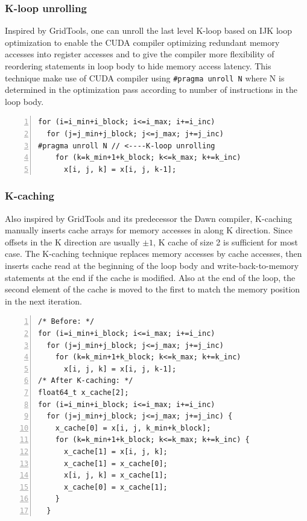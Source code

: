 \documentclass[]{article}
\begin{document}
\subsubsection{K-loop unrolling}
Inspired by GridTools, one can unroll the last level K-loop based on IJK loop optimization to enable the CUDA compiler optimizing redundant memory accesses into register accesses and to give the compiler more flexibility of reordering statements in loop body to hide memory access latency. This technique make use of CUDA compiler using \texttt{\#pragma unroll N} where N is determined in the optimization pass according to number of instructions in the loop body.
\begin{Verbatim}[frame=lines,numbers=left,label=K-loop unrolling,framesep=3mm]
for (i=i_min+i_block; i<=i_max; i+=i_inc)
  for (j=j_min+j_block; j<=j_max; j+=j_inc)
#pragma unroll N // <----K-loop unrolling
    for (k=k_min+1+k_block; k<=k_max; k+=k_inc)
      x[i, j, k] = x[i, j, k-1];
\end{Verbatim}
\subsubsection{K-caching}
Also inspired by GridTools and its predecessor the Dawn compiler, K-caching manually inserts cache arrays for memory accesses in along K direction. Since offsets in the K direction are usually $\pm 1$, K cache of size 2 is sufficient for most case. The K-caching technique replaces memory accesses by cache accesses, then inserts cache read at the beginning of the loop body and write-back-to-memory statements at the end if the cache is modified. Also at the end of the loop, the second element of the cache is moved to the first to match the memory position in the next iteration.    
\begin{Verbatim}[frame=lines,numbers=left,label=K-caching,framesep=3mm]
/* Before: */
for (i=i_min+i_block; i<=i_max; i+=i_inc)
  for (j=j_min+j_block; j<=j_max; j+=j_inc)
    for (k=k_min+1+k_block; k<=k_max; k+=k_inc)
      x[i, j, k] = x[i, j, k-1];
/* After K-caching: */
float64_t x_cache[2];
for (i=i_min+i_block; i<=i_max; i+=i_inc)
  for (j=j_min+j_block; j<=j_max; j+=j_inc) {
    x_cache[0] = x[i, j, k_min+k_block];
    for (k=k_min+1+k_block; k<=k_max; k+=k_inc) {
      x_cache[1] = x[i, j, k];
      x_cache[1] = x_cache[0];
      x[i, j, k] = x_cache[1];
      x_cache[0] = x_cache[1];
    }
  }
\end{Verbatim}
\end{document}
